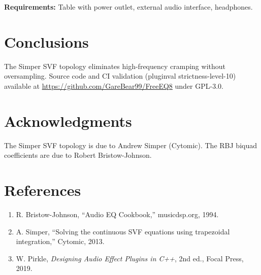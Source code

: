 \documentclass[10pt,twocolumn,a4paper]{article}
\begin{document}
\textbf{Requirements:} Table with power outlet, external audio interface, headphones.

\section{Conclusions}
The Simper SVF topology eliminates high-frequency cramping without oversampling. Source code and CI validation (pluginval strictness-level-10) available at \url{https://github.com/GareBear99/FreeEQ8} under GPL-3.0.

\section{Acknowledgments}
The Simper SVF topology is due to Andrew Simper (Cytomic). The RBJ biquad coefficients are due to Robert Bristow-Johnson.

\section*{References}
\begin{enumerate}
\item R. Bristow-Johnson, ``Audio EQ Cookbook,'' musicdsp.org, 1994.
\item A. Simper, ``Solving the continuous SVF equations using trapezoidal integration,'' Cytomic, 2013.
\item W. Pirkle, \textit{Designing Audio Effect Plugins in C++}, 2nd ed., Focal Press, 2019.
\end{enumerate}
\end{document}
